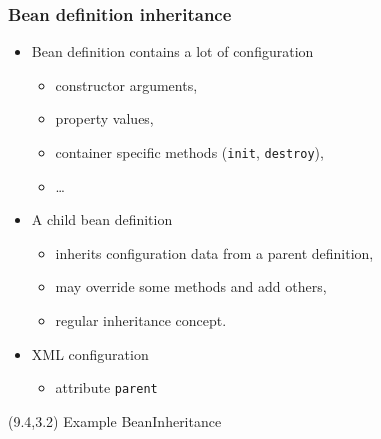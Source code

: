 \documentclass[10pt,xcolor=pdflatex, table]{beamer}
\begin{document}
\begin{frame}\frametitle{Bean definition inheritance}
	\begin{itemize}
    	\item Bean definition contains a lot of configuration
          \begin{itemize}
        	\item constructor arguments,
        	\item property values,
        	\item container specific methods (\texttt{init}, \texttt{destroy}),
        	\item \ldots
          \end{itemize}
		\item A child bean definition
          \begin{itemize}
            \item inherits configuration data from a parent definition,
        	\item may override some methods and add others,
        	\item regular inheritance concept.
          \end{itemize}
		\item XML configuration
          \begin{itemize}
        	\item attribute \texttt{parent}
          \end{itemize}
	\end{itemize}
\begin{textblock}{15}(9.4,3.2)
    {\footnotesize Example BeanInheritance}
\end{textblock}
\end{frame}
\end{document}
